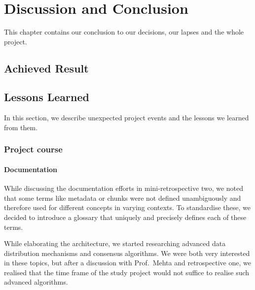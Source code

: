 \chapter{Discussion and Conclusion}
\label{sec:discussion-and-conclusion}

This chapter contains our conclusion to our decisions, our lapses and the whole project.

\section{Achieved Result}

\section{Lessons Learned}

In this section, we describe unexpected project events and the lessons we learned from them.

\subsection{Project course}
\subsubsection{Documentation}
While discussing the documentation efforts in mini-retrospective two, we noted that some terms like metadata or chunks were not defined unambiguously and therefore used for different concepts in varying contexts. To standardise these, we decided to introduce a glossary that uniquely and precisely defines each of these terms.

While elaborating the architecture, we started researching advanced data distribution mechanisms and consensus algorithms. We were both very interested in these topics, but after a discussion with Prof.~Mehta and retrospective one, we realised that the time frame of the study project would not suffice to realise such advanced algorithms.

